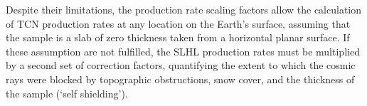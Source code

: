 Despite their limitations, the production rate scaling factors allow
the calculation of TCN production rates at any location on the Earth's
surface, assuming that the sample is a slab of zero thickness taken
from a horizontal planar surface. If these assumption are not
fulfilled, the SLHL production rates must be multiplied by a second
set of correction factors, quantifying the extent to which the cosmic
rays were blocked by topographic obstructions, snow cover, and the
thickness of the sample (`self shielding').
